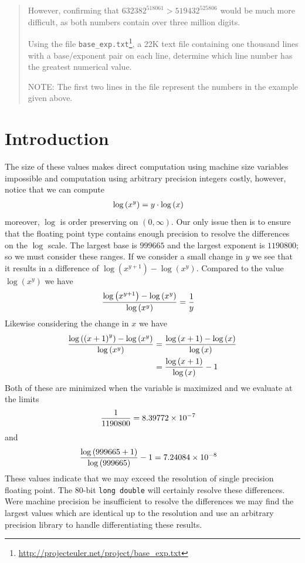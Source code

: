 \documentclass[oneside,12pt]{book}   	%
\newcounter{ex}
\newcounter{pr}
\theoremstyle{definition}
\begin{document}
\begin{spacing}{1.618}
\begin{quote}
			However, confirming that $632382^{518061} > 519432^{525806}$ would be much more difficult, as both numbers contain over three million digits.

			Using the file \texttt{base\_exp.txt}\footnote{\url{http://projecteuler.net/project/base_exp.txt}}, a 22K text file containing one thousand lines with a base/exponent pair on each line, determine which line number has the greatest numerical value.

			NOTE: The first two lines in the file represent the numbers in the example given above.
		\end{quote}
		
		\section{Introduction}
		
			The size of these values makes direct computation using machine size variables impossible and computation using arbitrary precision integers costly, however, notice that we can compute
			\begin{alignat}{4}
				\log{\left(x^y\right)}&=y\cdot\log{(x)} \notag 
			\end{alignat}
			moreover, $\log$ is order preserving on $(0, \infty)$. Our only issue then is to ensure that the floating point type contains enough precision to resolve the differences on the $\log$ scale. The largest base is $999665$ and the largest exponent is $1190800$; so we must consider these ranges. If we consider a small change in $y$ we see that it results in a difference of $\log{\left(x^{y+1}\right)}-\log{\left(x^y\right)}$. Compared to the value $\log{\left(x^y\right)}$ we have 
			\begin{alignat}{4}
				\frac{\log{\left(x^{y+1}\right)}-\log{\left(x^y\right)}}{\log{\left(x^y\right)}}&=\frac{1}{y} \notag
			\end{alignat}
			Likewise considering the change in $x$ we have 
			\begin{alignat}{4}
				\frac{\log{\left(\left(x+1\right)^y\right)}-\log{\left(x^y\right)}}{\log{\left(x^y\right)}}&=\frac{\log{(x+1)}-\log{(x)}}{\log{(x)}} \notag \\
					&=\frac{\log{(x+1)}}{\log{(x)}}-1 \notag 
			\end{alignat}
			Both of these are minimized when the variable is maximized and we evaluate at the limits
			\begin{alignat}{4}
				\frac{1}{1190800}&=8.39772\times 10^{-7}\notag 
			\end{alignat} 
			and
			\begin{alignat}{4}
				\frac{\log{(999665+1)}}{\log{(999665)}}-1&=7.24084\times 10^{-8} \notag 
			\end{alignat}
			These values indicate that we may exceed the resolution of single precision floating point. The 80-bit \texttt{long double} will certainly resolve these differences. Were machine precision be insufficient to resolve the differences we may find the largest values which are identical up to the resolution and use an arbitrary precision library to handle differentiating these results. 
			

\end{spacing}
\end{document}
